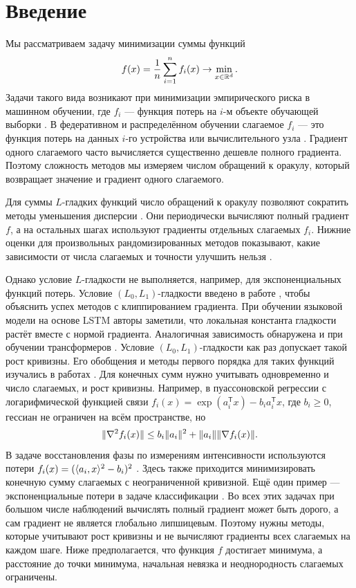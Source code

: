 \section{Введение}\label{sec:intro}

Мы рассматриваем задачу минимизации суммы функций
\[
 f(x)=\frac1n\sum_{i=1}^n f_i(x)\to\min_{x\in\mathbb R^d}.
\]
Задачи такого вида возникают при минимизации эмпирического риска
в машинном обучении, где $f_i$ --- функция потерь на $i$-м объекте
обучающей выборки \citep{shalev2014understanding,bottou2018optimization}.
В федеративном и распределённом обучении слагаемое $f_i$ --- это функция
потерь на данных $i$-го устройства или вычислительного узла
\citep{mcmahan2017communication}. Градиент одного слагаемого часто вычисляется
существенно дешевле полного градиента. Поэтому сложность методов мы измеряем
числом обращений к оракулу, который возвращает значение и градиент одного слагаемого.

Для суммы $L$-гладких функций число обращений к оракулу позволяют сократить
методы уменьшения дисперсии \citep{johnson2013svrg,xiao2014proxsvrg}.
Они периодически вычисляют полный градиент $f$, а на остальных
шагах используют градиенты отдельных слагаемых $f_i$.
Нижние оценки для произвольных рандомизированных методов показывают,
какие зависимости от числа слагаемых и точности улучшить нельзя
\citep{woodworth2016finite}.

Однако условие $L$-гладкости не выполняется, например, для экспоненциальных
функций потерь. Условие $(L_0,L_1)$-гладкости введено в работе
\citet{zhang2019gradient}, чтобы объяснить успех методов
с клиппированием градиента. При обучении языковой модели на основе LSTM авторы
заметили, что локальная константа гладкости растёт вместе с нормой градиента.
Аналогичная зависимость обнаружена и при обучении трансформеров
\citep{crawshaw2022robustness}.
Условие $(L_0,L_1)$-гладкости как раз допускает такой рост кривизны.
Его обобщения и методы первого порядка для таких функций изучались
в работах
\citet{li2023generalized,gorbunov2024methods,vankov2025optimizing,tyurin2025unified}.
Для конечных сумм нужно учитывать одновременно и число слагаемых, и рост кривизны.
Например, в пуассоновской регрессии с логарифмической функцией связи
\citep{stanPoisson}
$f_i(x)=\exp(a_i^{\mathsf T}x)-b_i a_i^{\mathsf T}x$, где $b_i\ge0$,
гессиан не ограничен на всём пространстве, но
\[
 \lVert\nabla^2 f_i(x)\rVert
 \le b_i\lVert a_i\rVert^2+\lVert a_i\rVert\lVert\nabla f_i(x)\rVert.
\]
В задаче восстановления фазы по измерениям интенсивности используются потери
$f_i(x)=(\langle a_i,x\rangle^2-b_i)^2$
\citep{candes2015wirtinger}. Здесь также приходится минимизировать конечную сумму
слагаемых с неограниченной кривизной.
Ещё один пример --- экспоненциальные потери в задаче классификации
\citep[пример~1.5]{gorbunov2024methods}.
Во всех этих задачах при большом числе наблюдений вычислять полный градиент
может быть дорого, а сам градиент не является глобально липшицевым.
Поэтому нужны методы, которые учитывают рост кривизны и не вычисляют
градиенты всех слагаемых на каждом шаге. Ниже предполагается,
что функция $f$ достигает минимума, а расстояние до точки минимума, начальная невязка
и неоднородность слагаемых ограничены.

